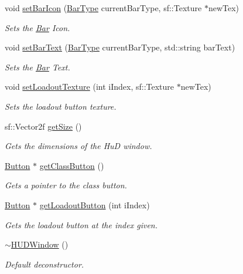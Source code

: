 \begin{DoxyCompactItemize}
void \hyperlink{class_h_u_d_window_a2d6d9c28be865a87ec9ffbba9ea45977}{set\+Bar\+Icon} (\hyperlink{_h_u_d_window_8h_a3bf4c8f0af36af02aca4222b3672bc1d}{Bar\+Type} current\+Bar\+Type, sf\+::\+Texture $\ast$new\+Tex)
\begin{DoxyCompactList}\small\item\em Sets the \hyperlink{class_bar}{Bar} Icon. \end{DoxyCompactList}\item 
void \hyperlink{class_h_u_d_window_ab23fc81f35b182ae23d3ee85fbc7104e}{set\+Bar\+Text} (\hyperlink{_h_u_d_window_8h_a3bf4c8f0af36af02aca4222b3672bc1d}{Bar\+Type} current\+Bar\+Type, std\+::string bar\+Text)
\begin{DoxyCompactList}\small\item\em Sets the \hyperlink{class_bar}{Bar} Text. \end{DoxyCompactList}\item 
void \hyperlink{class_h_u_d_window_ab89d2157a02b7092134cb2b58659c84f}{set\+Loadout\+Texture} (int i\+Index, sf\+::\+Texture $\ast$new\+Tex)
\begin{DoxyCompactList}\small\item\em Sets the loadout button texture. \end{DoxyCompactList}\item 
sf\+::\+Vector2f \hyperlink{class_h_u_d_window_a42beb8845c07df07ef5ef459b5d12bd0}{get\+Size} ()
\begin{DoxyCompactList}\small\item\em Gets the dimensions of the HuD window. \end{DoxyCompactList}\item 
\hyperlink{class_button}{Button} $\ast$ \hyperlink{class_h_u_d_window_aa4c9702e2f265e34560b9f2b77e468c4}{get\+Class\+Button} ()
\begin{DoxyCompactList}\small\item\em Gets a pointer to the class button. \end{DoxyCompactList}\item 
\hyperlink{class_button}{Button} $\ast$ \hyperlink{class_h_u_d_window_a06b79b305114538e82ea074378472d7a}{get\+Loadout\+Button} (int i\+Index)
\begin{DoxyCompactList}\small\item\em Gets the loadout button at the index given. \end{DoxyCompactList}\item 
\hyperlink{class_h_u_d_window_a6dfe3235d28ad412564f5bfe53a1b312}{$\sim$\+H\+U\+D\+Window} ()
\begin{DoxyCompactList}\small\item\em Default deconstructor. \end{DoxyCompactList}\end{DoxyCompactItemize}
